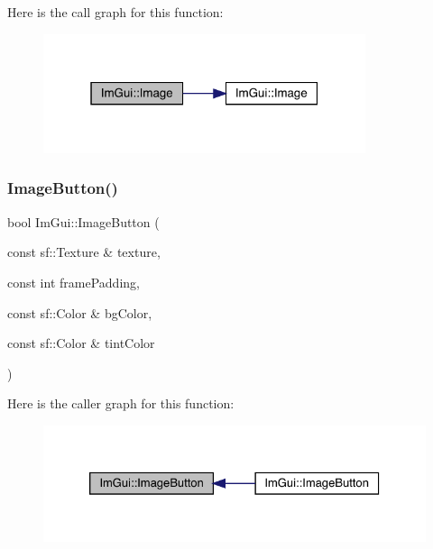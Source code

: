 Here is the call graph for this function\+:
\nopagebreak
\begin{figure}[H]
\begin{center}
\leavevmode
\includegraphics[width=268pt]{df/d13/namespace_im_gui_ad852f4318abae0ec25a66620811eeb3a_cgraph}
\end{center}
\end{figure}
\mbox{\label{namespace_im_gui_ab30a68eecc7388f7708e87968445c414}} 
\subsubsection{\texorpdfstring{Image\+Button()}{ImageButton()}\hspace{0.1cm}{\footnotesize\ttfamily [1/4]}}
{\footnotesize\ttfamily bool Im\+Gui\+::\+Image\+Button (\begin{DoxyParamCaption}\item[{const sf\+::\+Texture \&}]{texture,  }\item[{const int}]{frame\+Padding,  }\item[{const sf\+::\+Color \&}]{bg\+Color,  }\item[{const sf\+::\+Color \&}]{tint\+Color }\end{DoxyParamCaption})}

Here is the caller graph for this function\+:
\nopagebreak
\begin{figure}[H]
\begin{center}
\leavevmode
\includegraphics[width=326pt]{df/d13/namespace_im_gui_ab30a68eecc7388f7708e87968445c414_icgraph}
\end{center}
\end{figure}
\mbox{\label{namespace_im_gui_a54dd41917603ec28ae8aa42625aecda0}} 
